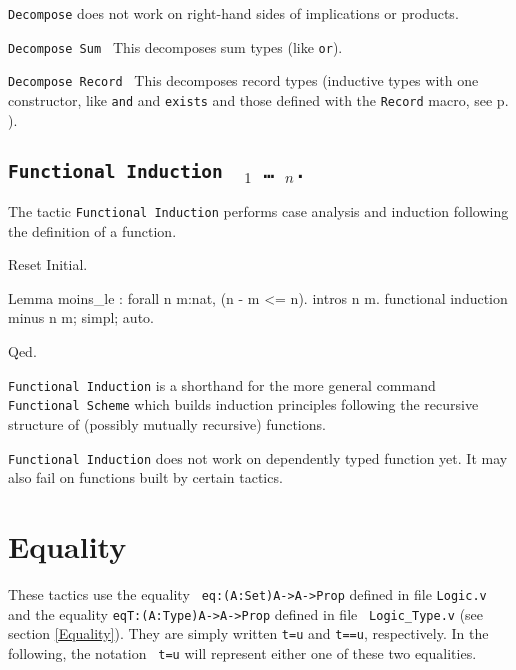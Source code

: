{\tt Decompose} does not work on right-hand sides of implications or products.

\begin{Variants}
  
\item {\tt Decompose Sum \term}
  This decomposes sum types (like \texttt{or}).
\item {\tt Decompose Record \term}
  This decomposes record types (inductive types with one constructor,
  like \texttt{and} and \texttt{exists} and those defined with the
  \texttt{Record} macro, see p. \pageref{Record}).
\end{Variants}


\subsection{\tt Functional Induction \ident\ \term$_1$ \dots\ \term$_n$.}
\label{FunInduction}

The tactic \texttt{Functional Induction} performs case analysis
and induction following the definition of a function.

\begin{coq_eval}
Reset Initial.
\end{coq_eval}
\begin{coq_example}
Lemma moins_le : forall n m:nat, (n - m <= n).
intros n m.
functional induction minus n m; simpl; auto.
\end{coq_example}
\begin{coq_example*}
Qed.
\end{coq_example*}

\texttt{Functional Induction} is a shorthand for the more general
command \texttt{Functional Scheme} which builds induction
principles following the recursive structure of (possibly
mutually recursive) functions.

\texttt{Functional Induction} does not work on dependently typed
function yet. It may also fail on functions built by certain
tactics.

\SeeAlso{\ref{FunScheme},\ref{FunScheme-examples}}

\section{Equality}
These tactics use the equality {\tt
eq:(A:Set)A->A->Prop} defined in file {\tt Logic.v} and the equality
{\tt eqT:(A:Type)A->A->Prop} defined in file {\tt
Logic\_Type.v} (see section \ref{Equality}). They
are simply written {\tt t=u} and {\tt t==u},
respectively.  In the following, the notation {\tt
t=u} will represent either one of these two
equalities.

